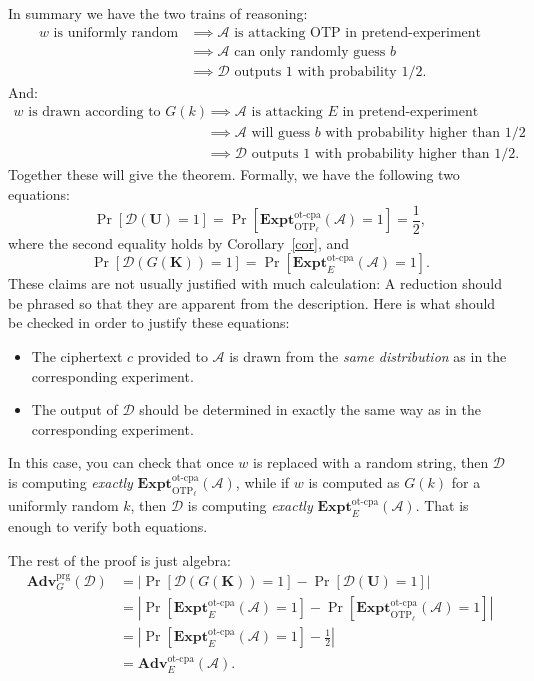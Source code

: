\documentclass[11pt]{article}
\newcommand{\calD}{\mathcal{D}}
\newcommand{\calA}{\mathcal{A}}
\newcommand{\Adv}{\mathbf{Adv}}
\newcommand{\AdvPRG}[2]{\Adv^{\mathrm{prg}}_{#1}({#2})}
\newcommand{\bK}{\mathbf{K}}
\newcommand{\bU}{\mathbf{U}}
\newcommand{\otp}{\mathrm{OTP}}
\newcommand{\ExptOTCPA}{\mathbf{Expt}^{\mathrm{ot\mbox{-}cpa}}}
\newcommand{\AdvOTCPA}[2]{\Adv^{\mathrm{ot\mbox{-}cpa}}_{#1}({#2})}
\begin{document}
In summary we have the two trains of reasoning:
\begin{align*}
    \text{$w$ is uniformly random} 
    & \implies \text{$\calA$ is attacking OTP in pretend-experiment} \\
    & \implies \text{$\calA$ can only randomly guess $b$} \\
    & \implies \text{$\calD$ outputs $1$ with probability $1/2$}.
\end{align*}
And:
\begin{align*}
    \text{$w$ is drawn according to $G(k)$} 
    & \implies \text{$\calA$ is attacking $E$ in pretend-experiment} \\
    & \implies \text{$\calA$ will guess $b$ with probability higher than $1/2$} \\
    & \implies \text{$\calD$ outputs $1$ with probability higher than $1/2$}.
\end{align*}
Together these will give the theorem.
Formally, we have the following two equations:
\[
    \Pr[\calD(\bU) = 1] = 
    \Pr[\ExptOTCPA_{\otp_\ell}(\calA) = 1] = \frac{1}{2},
\]
where the second equality holds by Corollary~\ref{cor}, and
\[
    \Pr[\calD(G(\bK)) = 1] = 
    \Pr[\ExptOTCPA_{E}(\calA) = 1].
\]
These claims are not usually justified with much calculation: A reduction
should be phrased so that they are apparent from the description. Here
is what should be checked in order to justify these equations:
\begin{itemize}

    \item The ciphertext $c$ provided to $\calA$ is drawn from the \emph{same
        distribution} as in the corresponding experiment.

    \item The output of $\calD$ should be determined in exactly the same way as
        in the corresponding experiment.

\end{itemize}
In this case, you can check that once $w$ is replaced with a random string,
then $\calD$ is computing \emph{exactly} $\ExptOTCPA_{\otp_\ell}(\calA)$,
while if $w$ is computed as $G(k)$ for a uniformly random $k$, then $\calD$
is computing \emph{exactly} $\ExptOTCPA_E(\calA)$. That is enough
to verify both equations.

The rest of the proof is just algebra:
\begin{align*}
    \AdvPRG{G}{\calD} 
    & = \left|\Pr[\calD(G(\bK)) = 1] - \Pr[\calD(\bU) = 1]\right| \\
    & = \left|\Pr[\ExptOTCPA_E(\calA) = 1]
    -  \Pr[\ExptOTCPA_{\otp_\ell}(\calA) = 1]\right| \\
    & = \left|\Pr[\ExptOTCPA_E(\calA) = 1]
    -  \frac{1}{2}\right| \\
    & = \AdvOTCPA{E}{\calA}. 
\end{align*}
\end{document}
